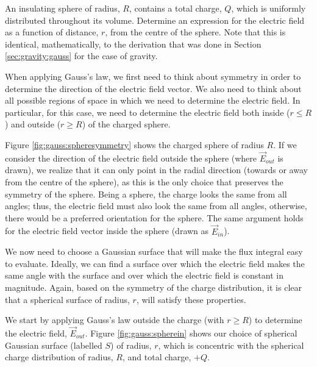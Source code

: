 \begin{example}{An insulating sphere of radius, $R$, contains a total charge, $Q$, which is uniformly distributed throughout its volume. Determine an expression for the electric field as a function of distance, $r$, from the centre of the sphere.\label{ex:gauss:spherical}}
Note that this is identical, mathematically, to the derivation that was done in Section \ref{sec:gravity:gauss} for the case of gravity. 

When applying Gauss's law,  we first need to think about symmetry in order to determine the direction of the electric field vector. We also need to think about all possible regions of space in which we need to determine the electric field. In particular, for this case, we need to determine the electric field both inside ($r\leq R$) and outside ($r\geq R$) of the charged sphere.

Figure \ref{fig:gauss:spheresymmetry} shows the charged sphere of radius $R$. If we consider the direction of the electric field outside the sphere (where $\vec E_{out}$ is drawn), we realize that it can only point in the radial direction (towards or away from the centre of the sphere), as this is the only choice that preserves the symmetry of the sphere. Being a sphere, the charge looks the same from all angles; thus, the electric field must also look the same from all angles, otherwise, there would be a preferred orientation for the sphere. The same argument holds for the electric field vector inside the sphere (drawn as $\vec E_{in}$). 

We now need to choose a Gaussian surface that will make the flux integral easy to evaluate. Ideally, we can find a surface over which the electric field makes the same angle with the surface and over which the electric field is constant in magnitude. Again, based on the symmetry of the charge distribution, it is clear that a spherical surface of radius, $r$, will satisfy these properties.

We start by applying Gauss's law outside the charge (with $r\geq R$) to determine the electric field, $\vec E_{out}$. Figure \ref{fig:gauss:spherein} shows our choice of spherical Gaussian surface (labelled $S$) of radius, $r$, which is concentric with the spherical charge distribution of radius, $R$, and total charge, $+Q$.


\end{example}

